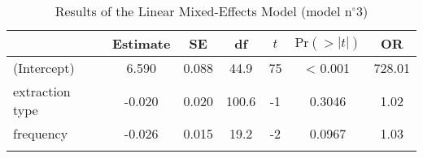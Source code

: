 \begin{table}
\begin{tabular}{l S[table-format=-1.3] S[table-format=1.3] S[table-format=3.1] S[table-format=-1] S[table-format=<1.4] S[table-format=3.2] }
  \lsptoprule
 & {Estimate} & {SE} & {df} & {$t$} & {$\text{Pr}(>|t|)$} & {OR} \\ 
  \midrule
(Intercept) & 6.590 & 0.088 & 44.9 & 75 & < 0.001 & 728.01 \\ 
  extraction type & -0.020 & 0.020 & 100.6 & -1 & 0.3046 & 1.02 \\ 
  frequency & -0.026 & 0.015 & 19.2 & -2 & 0.0967 & 1.03 \\ 
   \lspbottomrule
\end{tabular}
\caption{Results of the Linear Mixed-Effects Model (model n$^{\circ}$3)}
\label{tab:exp09-m3}
\end{table}
